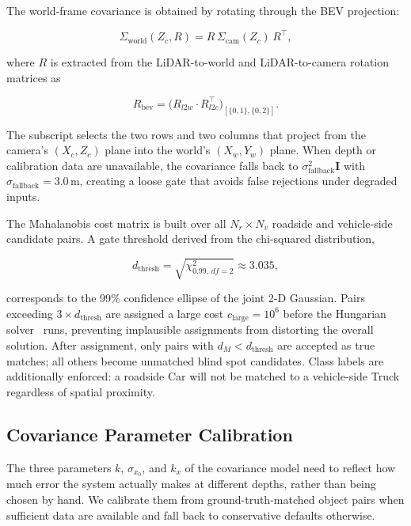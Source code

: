 \documentclass[12pt]{article}
\begin{document}
\medskip
The world-frame covariance is obtained by rotating through the BEV projection:

\begin{equation}
    \Sigma_{\text{world}}(Z_c, R) = R\,\Sigma_{\text{cam}}(Z_c)\,R^\top,
    \label{eq:cov_world}
\end{equation}

\noindent where $R$ is extracted from the LiDAR-to-world and LiDAR-to-camera rotation matrices as

\begin{equation}
    R_{\text{bev}} = \bigl(R_{l2w} \cdot R_{l2c}^\top\bigr)_{[\{0,1\},\{0,2\}]}.
\end{equation}

\noindent The subscript selects the two rows and two columns that project from the camera's $(X_c, Z_c)$ plane into the world's $(X_w, Y_w)$ plane. When depth or calibration data are unavailable, the covariance falls back to $\sigma_{\text{fallback}}^2\mathbf{I}$ with $\sigma_{\text{fallback}} = 3.0$\,m, creating a loose gate that avoids false rejections under degraded inputs.

\medskip
The Mahalanobis cost matrix is built over all $N_r \times N_v$ roadside and vehicle-side candidate pairs. A gate threshold derived from the chi-squared distribution,

\begin{equation}
    d_{\text{thresh}} = \sqrt{\chi^2_{0.99,\,df=2}} \approx 3.035,
\end{equation}

\noindent corresponds to the 99\% confidence ellipse of the joint 2-D Gaussian. Pairs exceeding $3\times d_{\text{thresh}}$ are assigned a large cost $c_{\text{large}} = 10^6$ before the Hungarian solver~\cite{kuhn1955hungarian} runs, preventing implausible assignments from distorting the overall solution. After assignment, only pairs with $d_M < d_{\text{thresh}}$ are accepted as true matches; all others become unmatched blind spot candidates. Class labels are additionally enforced: a roadside Car will not be matched to a vehicle-side Truck regardless of spatial proximity.

\subsection{Covariance Parameter Calibration}
\label{sec:calibration}

The three parameters $k$, $\sigma_{x_0}$, and $k_x$ of the covariance model need to reflect how much error the system actually makes at different depths, rather than being chosen by hand. We calibrate them from ground-truth-matched object pairs when sufficient data are available and fall back to conservative defaults otherwise.
\end{document}
